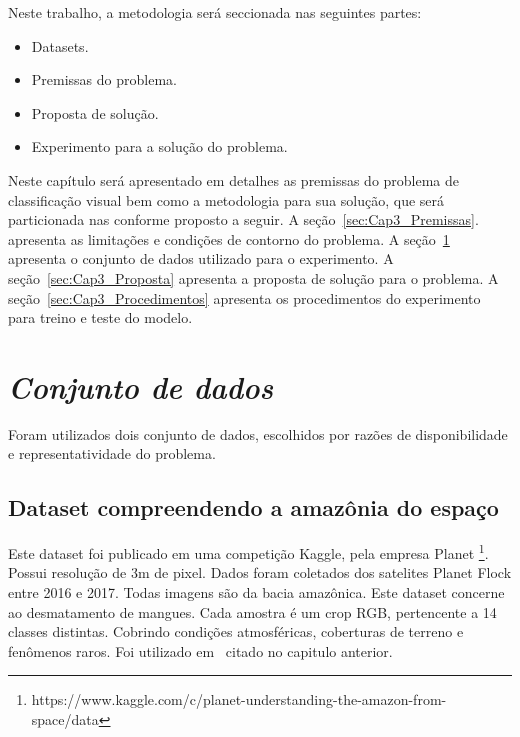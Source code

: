 Neste trabalho, a metodologia será seccionada nas seguintes partes:
\begin{itemize}
    \item  Datasets.
    \item  Premissas do problema.
    \item  Proposta de solução.
    \item  Experimento para a solução do problema.

\end{itemize}

Neste capítulo será apresentado em detalhes as premissas do problema de classificação visual bem como a metodologia para sua solução, que será particionada nas conforme proposto a seguir. A seção~\ref{sec:Cap3_Premissas}. apresenta as limitações e condições de contorno do problema. A seção~\ref{sec:Cap3_Dataset} apresenta o conjunto de dados utilizado para o experimento. A seção~\ref{sec:Cap3_Proposta} apresenta a proposta de solução para o problema. A seção~\ref{sec:Cap3_Procedimentos} apresenta os procedimentos do experimento para treino e teste do modelo.


\section{\textit{Conjunto de dados}}\label{sec:Cap3_Dataset}
Foram utilizados dois conjunto de dados, escolhidos por razões de disponibilidade e representatividade do problema. 


\subsection{Dataset compreendendo a amazônia do espaço}\label{sec:Cap3_Amazon_dataset}

Este dataset foi publicado em uma competição Kaggle, pela empresa Planet \footnote{https://www.kaggle.com/c/planet-understanding-the-amazon-from-space/data}. Possui resolução de 3m de pixel. Dados foram coletados dos satelites Planet Flock entre 2016 e 2017. Todas imagens são da bacia amazônica. Este dataset concerne ao desmatamento de mangues. Cada amostra é um crop RGB, pertencente a 14 classes distintas. Cobrindo condições atmosféricas, coberturas de terreno e fenômenos raros. Foi utilizado em~\cite{9701667} citado no capitulo anterior.

